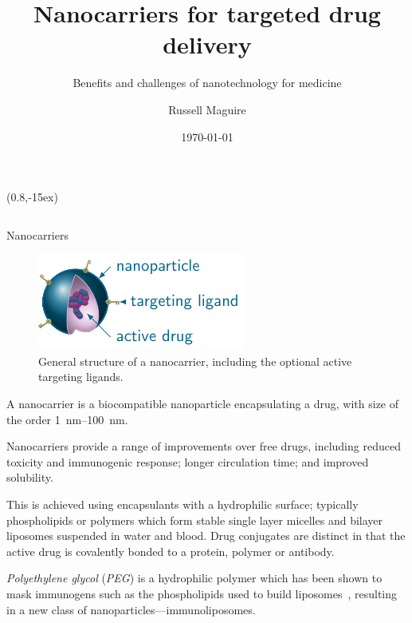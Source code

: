 \documentclass[final]{beamer}
\author{Russell Maguire}
\title{Nanocarriers for targeted drug delivery}
\subtitle{Benefits and challenges of nanotechnology for medicine}
\institute{ENGI4131 Advanced Semiconductor Devices \\ Durham University}
\date{\today}
\begin{document}
\begin{frame}[plain]
  
  \maketitle
  \begin{textblock*}{\textwidth}(0.8\textwidth,-15ex)
     \insertlogo
  \end{textblock*}

  \begin{columns}[t,onlytextwidth]
      \begin{block}{Nanocarriers\strut}
        \begin{multicols}{2}

          \begin{figure}[t]
            \centering
            \includegraphics[scale=4]{tikz/nanocarrier_structure.pdf}
            \caption{General structure of a \alert{nanocarrier}, including the optional \alert{active targeting} ligands.}
            \label{fig:structure}
          \end{figure}

          A nanocarrier is a \alert{biocompatible nanoparticle encapsulating a drug}, with size of the order \SIrange{1}{100}{\nano\meter}.

          Nanocarriers provide a range of improvements over free drugs, including \alert{reduced toxicity} and \alert{immunogenic response}; \alert{longer circulation time}; and \alert{improved solubility}.

          This is achieved using encapsulants with a hydrophilic surface; typically phospholipids or polymers which form stable \alert{single layer micelles} and \alert{bilayer liposomes} suspended in water and blood. \alert{Drug conjugates} are distinct in that the active drug is covalently bonded to a protein, polymer or antibody.

          \emph{Polyethylene glycol} (\emph{PEG}) is a hydrophilic polymer which has been shown to mask immunogens such as the phospholipids used to build liposomes~\cite{harris2003effect}, resulting in a new class of nanoparticles---\alert{immunoliposomes}. 


\end{multicols}
\end{block}
\end{columns}
\end{frame}
\end{document}
